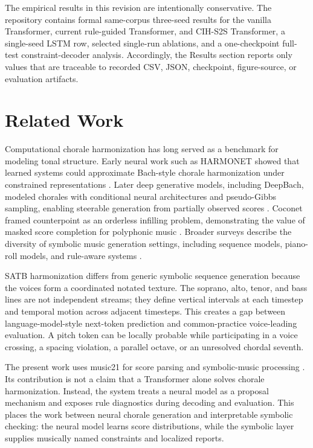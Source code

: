 \documentclass[11pt]{article}
\begin{document}
The empirical results in this revision are intentionally conservative. The repository contains formal same-corpus three-seed results for the vanilla Transformer, current rule-guided Transformer, and CIH-S2S Transformer, a single-seed LSTM row, selected single-run ablations, and a one-checkpoint full-test constraint-decoder analysis. Accordingly, the Results section reports only values that are traceable to recorded CSV, JSON, checkpoint, figure-source, or evaluation artifacts.

\section{Related Work}

Computational chorale harmonization has long served as a benchmark for modeling tonal structure. Early neural work such as HARMONET showed that learned systems could approximate Bach-style chorale harmonization under constrained representations \cite{hild1992harmonet}. Later deep generative models, including DeepBach, modeled chorales with conditional neural architectures and pseudo-Gibbs sampling, enabling steerable generation from partially observed scores \cite{hadjeres2017deepbach}. Coconet framed counterpoint as an orderless infilling problem, demonstrating the value of masked score completion for polyphonic music \cite{huang2017coconet}. Broader surveys describe the diversity of symbolic music generation settings, including sequence models, piano-roll models, and rule-aware systems \cite{briot2020deep}.

SATB harmonization differs from generic symbolic sequence generation because the voices form a coordinated notated texture. The soprano, alto, tenor, and bass lines are not independent streams; they define vertical intervals at each timestep and temporal motion across adjacent timesteps. This creates a gap between language-model-style next-token prediction and common-practice voice-leading evaluation. A pitch token can be locally probable while participating in a voice crossing, a spacing violation, a parallel octave, or an unresolved chordal seventh.

The present work uses music21 for score parsing and symbolic-music processing \cite{cuthbert2010music21}. Its contribution is not a claim that a Transformer alone solves chorale harmonization. Instead, the system treats a neural model as a proposal mechanism and exposes rule diagnostics during decoding and evaluation. This places the work between neural chorale generation and interpretable symbolic checking: the neural model learns score distributions, while the symbolic layer supplies musically named constraints and localized reports.
\end{document}
